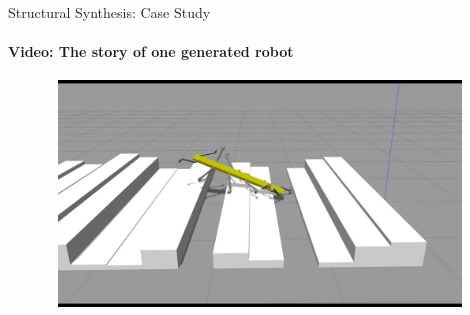 \documentclass[aspectratio=169]{beamer}
\begin{document}
\begin{frame}[t]{Structural Synthesis: Case Study}
    \framesubtitle{Video: The story of one generated robot}
    \vspace{-0.6cm}
    \begin{figure}[H]
        \href{https://youtu.be/DcovvkTZgsg}{
            \centering\includegraphics[height=6cm,width=1\textwidth,keepaspectratio]{genetic_video_preview.jpg}}
    \end{figure}
\end{frame}
\end{document}
